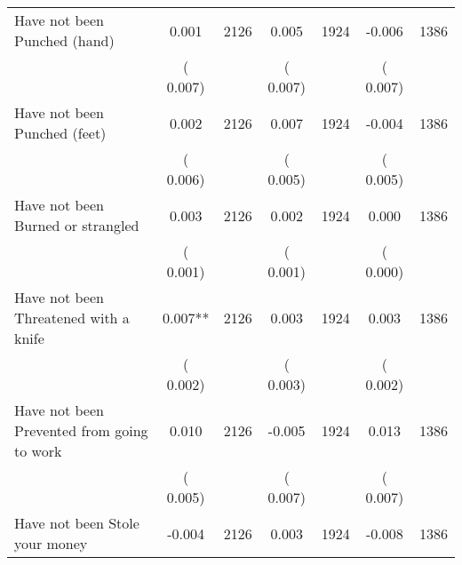 \begin{tabular}{l*{6}{c}}
Have not been Punched (hand)        &              0.001      &       2126       &              0.005      &       1924       &             -0.006      &       1386       \\
                       &       (       0.007)            &                               &       (       0.007)            &                               &       (       0.007)            &                               \\
Have not been Punched (feet)        &              0.002      &       2126       &              0.007      &       1924       &             -0.004      &       1386       \\
                       &       (       0.006)            &                               &       (       0.005)            &                               &       (       0.005)            &                               \\
Have not been Burned or strangled        &              0.003      &       2126       &              0.002      &       1924       &              0.000      &       1386       \\
                       &       (       0.001)            &                               &       (       0.001)            &                               &       (       0.000)            &                               \\
Have not been Threatened with a knife        &              0.007**      &       2126       &              0.003      &       1924       &              0.003      &       1386       \\
                       &       (       0.002)            &                               &       (       0.003)            &                               &       (       0.002)            &                               \\
Have not been Prevented from going to work        &              0.010      &       2126       &             -0.005      &       1924       &              0.013      &       1386       \\
                       &       (       0.005)            &                               &       (       0.007)            &                               &       (       0.007)            &                               \\
Have not been Stole your money        &             -0.004      &       2126       &              0.003      &       1924       &             -0.008      &       1386       \\

\end{tabular}
